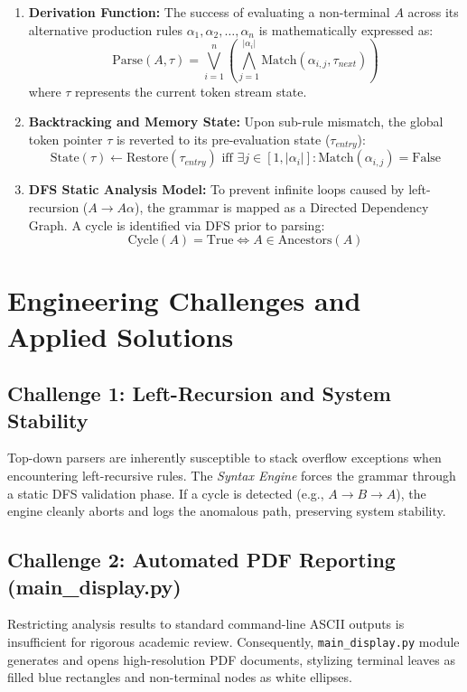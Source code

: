 \documentclass[12pt,a4paper]{article}
\begin{document}
    \begin{enumerate}
        \item \textbf{Derivation Function:} The success of evaluating a non-terminal $A$ across its alternative production rules $\alpha_1, \alpha_2, \dots, \alpha_n$ is mathematically expressed as:
        \[
        \text{Parse}(A, \tau) = \bigvee_{i=1}^{n} \left( \bigwedge_{j=1}^{|\alpha_i|} \text{Match}(\alpha_{i,j}, \tau_{next}) \right)
        \]
        where $\tau$ represents the current token stream state.

        \item \textbf{Backtracking and Memory State:} Upon sub-rule mismatch, the global token pointer $\tau$ is reverted to its pre-evaluation state ($\tau_{entry}$):
        \[
        \text{State}(\tau) \leftarrow \text{Restore}(\tau_{entry}) \text{ iff } \exists j \in [1, |\alpha_i|] : \text{Match}(\alpha_{i,j}) = \text{False}
        \]

        \item \textbf{DFS Static Analysis Model:} To prevent infinite loops caused by left-recursion ($A \to A\alpha$), the grammar is mapped as a Directed Dependency Graph. A cycle is identified via DFS prior to parsing:
        \[
        \text{Cycle}(A) = \text{True} \iff A \in \text{Ancestors}(A)
        \]
    \end{enumerate}

    \section{Engineering Challenges and Applied Solutions}
    
    \subsection{Challenge 1: Left-Recursion and System Stability}
    Top-down parsers are inherently susceptible to stack overflow exceptions when encountering left-recursive rules. The \textit{Syntax Engine} forces the grammar through a static DFS validation phase. If a cycle is detected (e.g., $A \to B \to A$), the engine cleanly aborts and logs the anomalous path, preserving system stability.

    \subsection{Challenge 2: Automated PDF Reporting (main\_display.py)}
    Restricting analysis results to standard command-line ASCII outputs is insufficient for rigorous academic review. Consequently, \texttt{main\_display.py} module generates and opens high-resolution PDF documents, stylizing terminal leaves as filled blue rectangles and non-terminal nodes as white ellipses.
\end{document}
